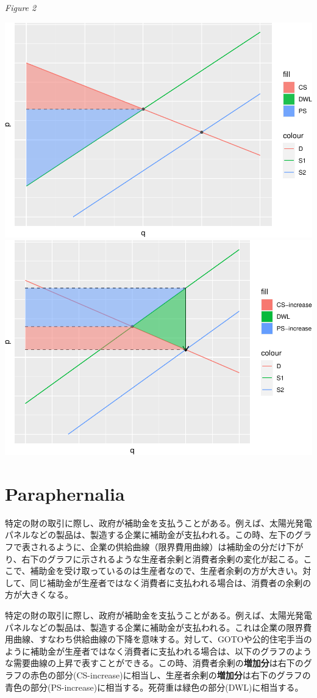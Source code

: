 \documentclass[
]{ltjarticle}
\begin{document}
\begin{center} \textit{Figure 2} \end{center}

\includegraphics[width=0.5\linewidth]{group-report_files/figure-latex/version1-1}
\includegraphics[width=0.5\linewidth]{group-report_files/figure-latex/version1-2}

\newpage
\newpage
\newpage

\hypertarget{paraphernalia}{%
\section{Paraphernalia}\label{paraphernalia}}

特定の財の取引に際し、政府が補助金を支払うことがある。例えば、太陽光発電パネルなどの製品は、製造する企業に補助金が支払われる。この時、左下のグラフで表されるように、企業の供給曲線（限界費用曲線）は補助金の分だけ下がり、右下のグラフに示されるような生産者余剰と消費者余剰の変化が起こる。ここで、補助金を受け取っているのは生産者なので、生産者余剰の方が大きい。対して、同じ補助金が生産者ではなく消費者に支払われる場合は、消費者の余剰の方が大きくなる。

特定の財の取引に際し、政府が補助金を支払うことがある。例えば、太陽光発電パネルなどの製品は、製造する企業に補助金が支払われる。これは企業の限界費用曲線、すなわち供給曲線の下降を意味する。対して、GOTOや公的住宅手当のように補助金が生産者ではなく消費者に支払われる場合は、以下のグラフのような需要曲線の上昇で表すことができる。この時、消費者余剰の\textbf{増加分}は右下のグラフの赤色の部分(CS-increase)に相当し、生産者余剰の\textbf{増加分}は右下のグラフの青色の部分(PS-increase)に相当する。死荷重は緑色の部分(DWL)に相当する。
\end{document}

